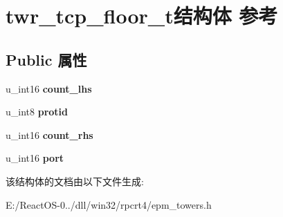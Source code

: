 \hypertarget{structtwr__tcp__floor__t}{}\section{twr\+\_\+tcp\+\_\+floor\+\_\+t结构体 参考}
\label{structtwr__tcp__floor__t}
\subsection*{Public 属性}
\begin{DoxyCompactItemize}
\item 
\mbox{\label{structtwr__tcp__floor__t_a4d6d3c82a327e092fd833f62ab678847}} 
u\+\_\+int16 {\bfseries count\+\_\+lhs}
\item 
\mbox{\label{structtwr__tcp__floor__t_a1ae96be1938f00dbf11f37287ebc891d}} 
u\+\_\+int8 {\bfseries protid}
\item 
\mbox{\label{structtwr__tcp__floor__t_afc0c00e4de431be09cb6ceda4bfa6360}} 
u\+\_\+int16 {\bfseries count\+\_\+rhs}
\item 
\mbox{\label{structtwr__tcp__floor__t_a5a3ff4c7984cc04b16db3177f5961bc4}} 
u\+\_\+int16 {\bfseries port}
\end{DoxyCompactItemize}


该结构体的文档由以下文件生成\+:\begin{DoxyCompactItemize}
\item 
E\+:/\+React\+O\+S-\/0../dll/win32/rpcrt4/epm\+\_\+towers.\+h\end{DoxyCompactItemize}
